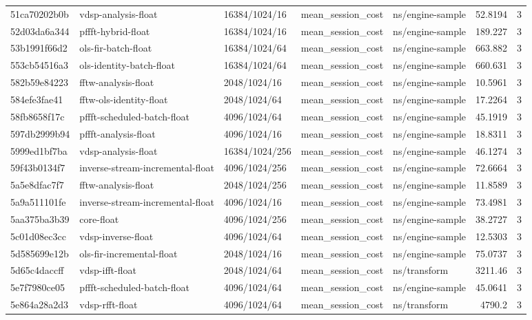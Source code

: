 \begin{longtable}{lllllrr}
51ca70202b0b & vdsp-analysis-float & 16384/1024/16 & mean\_session\_cost & ns/engine-sample & 52.8194 & 3 \\
52d03da6a344 & pffft-hybrid-float & 16384/1024/16 & mean\_session\_cost & ns/engine-sample & 189.227 & 3 \\
53b1991f66d2 & ols-fir-batch-float & 16384/1024/64 & mean\_session\_cost & ns/engine-sample & 663.882 & 3 \\
553cb54516a3 & ols-identity-batch-float & 16384/1024/64 & mean\_session\_cost & ns/engine-sample & 660.631 & 3 \\
582b59e84223 & fftw-analysis-float & 2048/1024/16 & mean\_session\_cost & ns/engine-sample & 10.5961 & 3 \\
584efe3fae41 & fftw-ols-identity-float & 2048/1024/64 & mean\_session\_cost & ns/engine-sample & 17.2264 & 3 \\
58fb8658f17c & pffft-scheduled-batch-float & 4096/1024/64 & mean\_session\_cost & ns/engine-sample & 45.1919 & 3 \\
597db2999b94 & pffft-analysis-float & 4096/1024/16 & mean\_session\_cost & ns/engine-sample & 18.8311 & 3 \\
5999ed1bf7ba & vdsp-analysis-float & 16384/1024/256 & mean\_session\_cost & ns/engine-sample & 46.1274 & 3 \\
59f43b0134f7 & inverse-stream-incremental-float & 4096/1024/256 & mean\_session\_cost & ns/engine-sample & 72.6664 & 3 \\
5a5e8dfac7f7 & fftw-analysis-float & 2048/1024/256 & mean\_session\_cost & ns/engine-sample & 11.8589 & 3 \\
5a9a511101fe & inverse-stream-incremental-float & 4096/1024/16 & mean\_session\_cost & ns/engine-sample & 73.4981 & 3 \\
5aa375ba3b39 & core-float & 4096/1024/256 & mean\_session\_cost & ns/engine-sample & 38.2727 & 3 \\
5c01d08ec3cc & vdsp-inverse-float & 4096/1024/64 & mean\_session\_cost & ns/engine-sample & 12.5303 & 3 \\
5d585699e12b & ols-fir-incremental-float & 2048/1024/16 & mean\_session\_cost & ns/engine-sample & 75.0737 & 3 \\
5d65c4daccff & vdsp-ifft-float & 2048/1024/64 & mean\_session\_cost & ns/transform & 3211.46 & 3 \\
5e7f7980ce05 & pffft-scheduled-batch-float & 4096/1024/64 & mean\_session\_cost & ns/engine-sample & 45.0641 & 3 \\
5e864a28a2d3 & vdsp-rfft-float & 4096/1024/64 & mean\_session\_cost & ns/transform & 4790.2 & 3 \\

\end{longtable}
